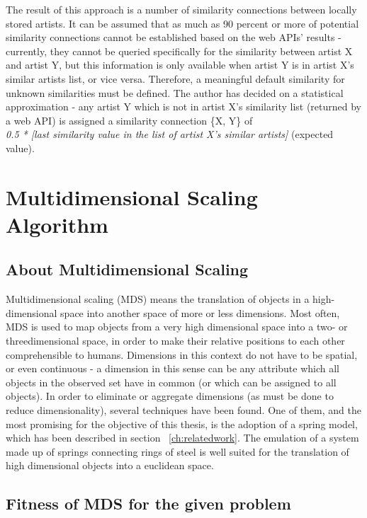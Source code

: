 The result of this approach is a number of similarity connections between locally stored artists. It can be assumed
that as much as 90 percent or more of potential similarity connections cannot be established based on the web APIs'
results - currently, they cannot be queried specifically for the similarity between artist X and artist Y, but 
this information is only available when artist Y is in artist X's similar artists list, or vice versa.
Therefore, a meaningful default similarity for unknown similarities must be defined. The author has decided on a
statistical approximation - any artist Y which is not in artist X's similarity list (returned by a web API) is 
assigned a similarity connection \{X, Y\} of \\
\emph{0.5 * [last similarity value in the list of artist X's similar artists]} (expected value).

\section{Multidimensional Scaling Algorithm}

\subsection{About Multidimensional Scaling}

Multidimensional scaling (MDS) means the translation of objects in a high-dimensional space into another space of more or less dimensions. Most often, MDS is used to map objects from a very high dimensional space into a two- or threedimensional space, in order to make their relative positions to each other comprehensible to humans. 
Dimensions in this context do not have to be spatial, or even continuous - a dimension in this sense can be any attribute which all objects in the observed set have in common (or which can be assigned to all objects).
In order to eliminate or aggregate dimensions (as must be done to reduce dimensionality), several techniques have been found.
One of them, and the most promising for the objective of this thesis, is the adoption of a spring model, which has been described in section ~\ref{ch:relatedwork}. The emulation of a system made up of springs connecting rings of steel is well suited for the translation of high dimensional objects into a euclidean space.

\subsection{Fitness of MDS for the given problem}


